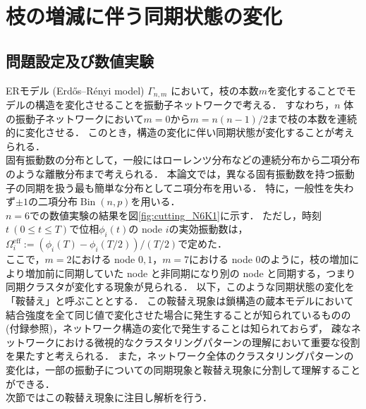 \documentclass[../main]{subfiles}
\begin{document}
\chapter{枝の増減に伴う同期状態の変化}
\label{chap:method-3body}
\section{問題設定及び数値実験}
\label{sec:method-3body-settting}
ERモデル (Erd\H{o}s–R\'{e}nyi model) $\Gamma_{n,m}$ において，枝の本数$m$を変化することでモデルの構造を変化させることを振動子ネットワークで考える．
すなわち，$n$ 体の振動子ネットワークにおいて$m=0$から$m=n(n-1)/2$まで枝の本数を連続的に変化させる．
このとき，構造の変化に伴い同期状態が変化することが考えられる．\\
固有振動数の分布として，一般にはローレンツ分布などの連続分布\cite{kuramoto1975}から二項分布のような離散分布\cite{1992BonillaNeuSpigler}まで考えられる．
本論文では，異なる固有振動数を持つ振動子の同期を扱う最も簡単な分布としてニ項分布を用いる．
特に，一般性を失わず$\pm 1$の二項分布$\operatorname{Bin}(n,p)$を用いる．\\
$n=6$での数値実験の結果を図\ref{fig:cutting_N6K1}に示す．
ただし，時刻$t\ (0\leq t\leq T)$で位相$\phi_i(t)$の node $i$の実効振動数は，$\Omega_i^{\mathrm{eff}}:=(\phi_i(T)-\phi_i(T/2))/(T/2)$で定めた．\\
ここで，$m=2$における node $0,1$，$m=7$における node $0$のように，枝の増加により増加前に同期していた node と非同期になり別の node と同期する，つまり同期クラスタが変化する現象が見られる．
以下，このような同期状態の変化を「鞍替え」と呼ぶこととする．
この鞍替え現象は鎖構造の蔵本モデルにおいて結合強度を全て同じ値で変化させた場合に発生することが知られている\cite{XiaHuang:130506}ものの(付録参照)，ネットワーク構造の変化で発生することは知られておらず，
疎なネットワークにおける微視的なクラスタリングパターンの理解において重要な役割を果たすと考えられる．
また，ネットワーク全体のクラスタリングパターンの変化は，一部の振動子についての同期現象と鞍替え現象に分割して理解することができる．\\
次節ではこの鞍替え現象に注目し解析を行う．
\end{document}
